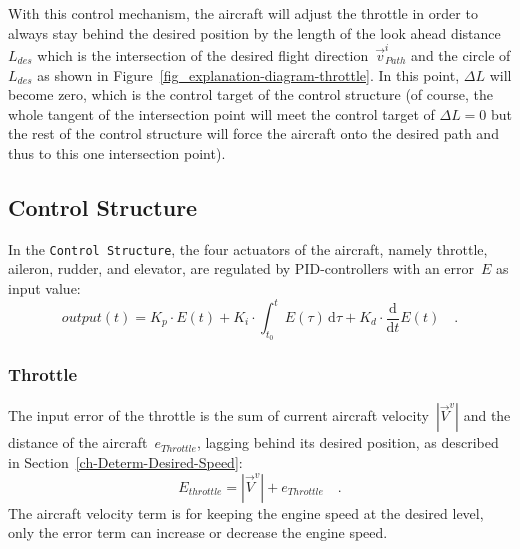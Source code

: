 \documentclass[11pt,a4paper]{scrartcl}		%
\begin{document}
With this control mechanism, the aircraft will adjust the throttle in order to always stay behind the desired position by the length of the look ahead distance~$L_{des}$ which is the intersection of the desired flight direction~$\vec{v}_{Path}^i$ and the circle of $L_{des}$ as shown in Figure~\ref{fig_explanation-diagram-throttle}. In this point, $\Delta L$ will become zero, which is the control target of the control structure (of course, the whole tangent of the intersection point will meet the control target of $\Delta L = 0$ but the rest of the control structure will force the aircraft onto the desired path and thus to this one intersection point).  

\medskip





\subsection{Control Structure}

In the \texttt{Control Structure}, the four actuators of the aircraft, namely throttle, aileron, rudder, and elevator, are regulated by PID-controllers with an error~$E$ as input value:
\begin{equation}
output(t) = K_p \cdot E(t) + K_i \cdot \int_{t_0}^t E(\tau)\, \mathrm{d}\tau + K_d \cdot \frac{\mathrm{d}}{\mathrm{d}t}E(t)\quad .
\end{equation}

\subsubsection*{Throttle}
The input error of the throttle is the sum of current aircraft velocity~$|\vec{V}^v|$ and the distance of the aircraft~$e_{Throttle}$, lagging behind its desired position, as described in Section~\ref{ch-Determ-Desired-Speed}:
\begin{equation}
E_{throttle} = |\vec{V}^v| + e_{Throttle} \quad .
\end{equation} 
The aircraft velocity term is for keeping the engine speed at the desired level, only the error term can increase or decrease the engine speed.
\end{document}

